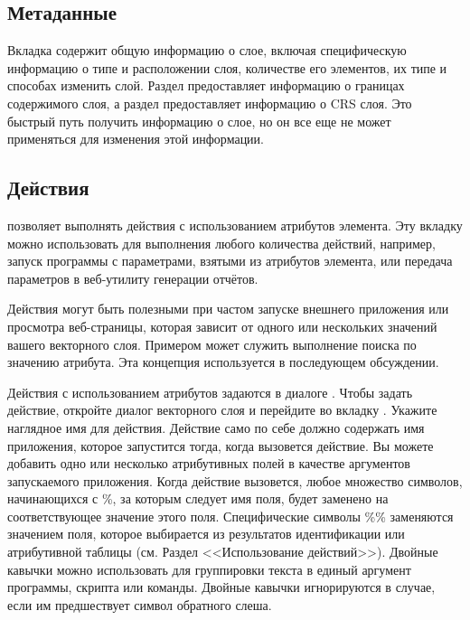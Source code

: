 \subsection{Метаданные}

Вкладка  содержит общую информацию о слое, включая
специфическую информацию о типе и расположении слоя, количестве его элементов,
их типе и способах изменить слой. Раздел  предоставляет
информацию о границах содержимого слоя, а раздел
 предоставляет информацию
о CRS слоя. Это быстрый путь получить информацию о слое, но он все еще не
может применяться для изменения этой информации.

\subsection{Действия}\label{label_actions}

\qg позволяет выполнять действия с использованием атрибутов элемента. Эту
вкладку можно использовать для выполнения любого количества действий, например,
запуск программы с параметрами, взятыми из атрибутов элемента, или передача
параметров в веб-утилиту генерации отчётов.

Действия могут быть полезными при частом запуске внешнего приложения или
просмотра веб-страницы, которая зависит от одного или нескольких значений
вашего векторного слоя. Примером может служить выполнение поиска по
значению атрибута. Эта концепция используется в  последующем обсуждении.


Действия с использованием атрибутов задаются в диалоге .
Чтобы задать действие, откройте диалог  векторного
слоя и перейдите во вкладку . Укажите наглядное имя для
действия. Действие само по себе должно содержать имя приложения, которое
запустится тогда, когда вызовется действие. Вы можете добавить одно или
несколько атрибутивных полей в качестве аргументов запускаемого приложения.
Когда действие вызовется, любое множество символов, начинающихся с \%, за
которым следует имя поля, будет заменено на соответствующее значение
этого поля. Специфические символы \%\% \index{\%\%} заменяются значением поля,
которое выбирается из результатов идентификации или атрибутивной таблицы
(см. Раздел <<Использование действий>>). Двойные кавычки можно использовать
для группировки текста в единый аргумент программы, скрипта или команды.
Двойные кавычки игнорируются в случае, если им предшествует символ обратного
слеша.


